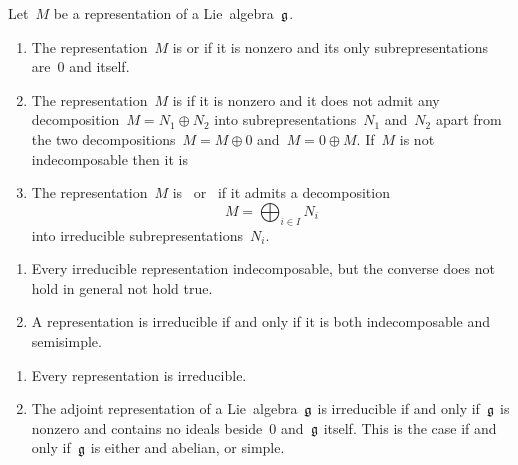 \begin{definition}
  Let~$M$ be a representation of a Lie~algebra~$\mathfrak{g}$.
  \begin{enumerate}
    \item
      The representation~$M$ is  or  if it is nonzero and its only subrepresentations are~$0$ and itself.
    \item
      The representation~$M$ is  if it is nonzero and it does not admit any decomposition~$M = N_1 \oplus N_2$ into subrepresentations~$N_1$ and~$N_2$ apart from the two decompositions~$M = M \oplus 0$ and~$M = 0 \oplus M$.
      If~$M$ is not indecomposable then it is 
    \item
      The representation~$M$ is~ or~ if it admits a decomposition
      \[
        M = \bigoplus_{i \in I} N_i
      \]
      into irreducible subrepresentations~$N_i$.
  \end{enumerate}
\end{definition}


\begin{remark}
  \leavevmode
  \begin{enumerate}
    \item
      Every irreducible representation indecomposable, but the converse does not hold in general not hold true.
    \item
      A representation is irreducible if and only if it is both indecomposable and semisimple.
  \end{enumerate}
\end{remark}


\begin{example}
  \leavevmode
  \begin{enumerate}
    \item
      Every {\onedimensional} representation is irreducible.
    \item
      The adjoint representation of a Lie~algebra~$\mathfrak{g}$ is irreducible if and only if~$\mathfrak{g}$ is nonzero and contains no ideals beside~$0$ and~$\mathfrak{g}$ itself.
      This is the case if and only if~$\mathfrak{g}$ is either {\onedimensional} and abelian, or simple.
  \end{enumerate}
\end{example}


